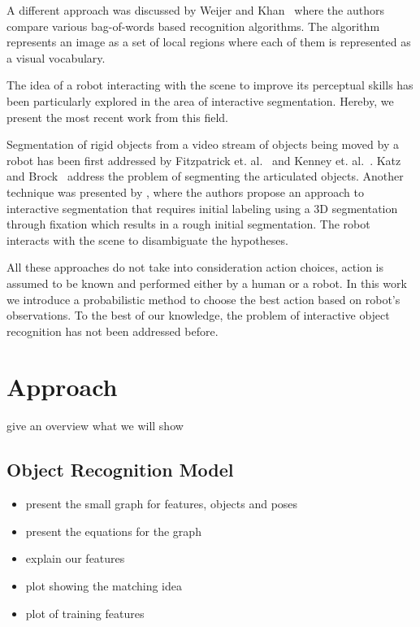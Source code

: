\documentclass[conference]{IEEEtran}
\begin{document}
A different approach was discussed by Weijer and Khan~\cite{van2013fusing} where the authors compare various bag-of-words based recognition algorithms. The algorithm represents an image as a set of local regions where each of them is represented as a visual vocabulary. %

The idea of a robot interacting with the scene to improve its perceptual skills has been particularly explored in the area of interactive segmentation. Hereby, we present the most recent work from this field.

Segmentation of rigid objects from a video stream 
of objects being moved by a robot has been first addressed by Fitzpatrick et. al.~\cite{fitzpatrick_active_vision} and Kenney et. al.~\cite{KenneyInteractive}.
Katz and Brock~\cite{Katz-WS-MM-ICRA2011} address
the problem of segmenting the articulated objects. Another technique was presented by \cite{bergstrom11icvs}, where the authors propose  an   approach  to
interactive  segmentation that  requires initial  labeling using  a 3D
segmentation  through  fixation  which  results  in  a  rough  initial
segmentation. The robot interacts with the scene to disambiguate
the hypotheses.


All these approaches do not take into consideration action choices, action is assumed to be known and performed either by a human or a robot. In this work we introduce a probabilistic method to choose the best action based on robot's observations. To the best of our knowledge, the problem of interactive object recognition has not been addressed before. 


\section{Approach}
give an overview what we will show

\subsection{Object Recognition Model}
\begin{itemize}
\item present the small graph for features, objects and poses
\item present the equations for the graph
\item explain our features
\item plot showing the matching idea
\item plot of training features
\end{itemize}
\end{document}

